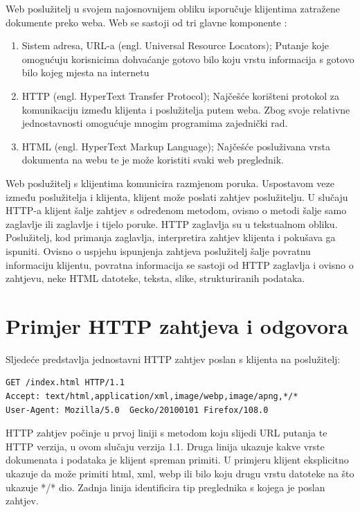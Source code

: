 \documentclass[]{foi}
\begin{document}
Web poslužitelj u svojem najosnovnijem obliku isporučuje klijentima zatražene dokumente preko weba.
Web se sastoji od tri glavne komponente \cite{yeager1996web}:
\begin{enumerate}
	\item Sistem adresa, URL-a (engl. Universal Resource Locators); Putanje koje omogućuju korisnicima
	      dohvaćanje gotovo bilo koju vrstu informacija s gotovo bilo kojeg mjesta na internetu
	\item HTTP (engl. HyperText Transfer Protocol); Najčešće korišteni protokol za komunikaciju između
	      klijenta i poslužitelja putem weba. Zbog svoje relativne jednostavnosti omogućuje mnogim programima
	      zajednički rad.
	\item HTML (engl. HyperText Markup Language); Najčešće posluživana vrsta dokumenta na webu te je može
	      koristiti svaki web preglednik.
\end{enumerate}

Web poslužitelj s klijentima komunicira razmjenom poruka. Uspostavom veze između poslužitelja i klijenta,
klijent može poslati zahtjev poslužitelju. U slučaju HTTP-a klijent šalje zahtjev s određenom metodom,
ovisno o metodi šalje samo zaglavlje ili zaglavlje i tijelo poruke. HTTP zaglavlja su u tekstualnom obliku.
Poslužitelj, kod primanja zaglavlja, interpretira zahtjev klijenta i pokušava ga ispuniti. Ovisno o
uspjehu ispunjenja zahtjeva poslužitelj šalje povratnu informaciju klijentu, povratna informacija se sastoji
od HTTP zaglavlja i ovisno o zahtjevu, neke HTML datoteke, teksta, slike, strukturiranih podataka.

\section{Primjer HTTP zahtjeva i odgovora}

Sljedeće predstavlja jednostavni HTTP zahtjev poslan s klijenta na poslužitelj:
\begin{verbatim}
GET /index.html HTTP/1.1
Accept: text/html,application/xml,image/webp,image/apng,*/*
User-Agent: Mozilla/5.0  Gecko/20100101 Firefox/108.0
\end{verbatim}

HTTP zahtjev počinje u prvoj liniji s metodom koju slijedi URL putanja te HTTP verzija, u ovom slučaju verzija 1.1.
Druga linija ukazuje kakve vrste dokumenata i podataka je klijent spreman primiti. U primjeru klijent eksplicitno ukazuje da
može primiti html, xml, webp ili bilo koju drugu vrstu datoteke na što ukazuje */* dio.
Zadnja linija identificira tip preglednika s kojega je poslan zahtjev.
\end{document}
